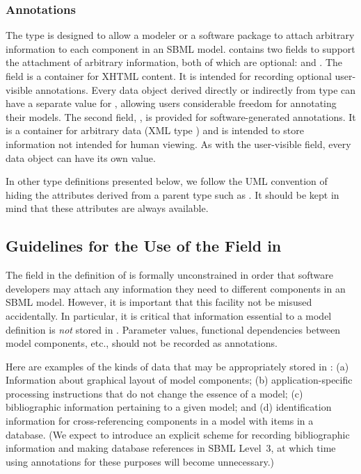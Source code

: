 \documentclass[10pt]{cekarticle}
\begin{document}
\subsubsection{Annotations}

The type  is designed to allow a modeler or a
software package to attach arbitrary information to each component
in an SBML model.   contains two fields to support
the attachment of arbitrary information, both of which are
optional:  and . The field
 is a container for XHTML content.  It is intended
for recording optional user-visible annotations.  Every data
object derived directly or indirectly from type  can
have a separate value for , allowing users
considerable freedom for annotating their models.  The second
field, , is provided for software-generated
annotations.  It is a container for arbitrary data (XML type
) and is intended to store information not intended for
human viewing.  As with the user-visible  field,
every data object can have its own  value.

In other type definitions presented below, we follow the UML
convention of hiding the attributes derived from a parent type
such as . It should be kept in mind that these
attributes are always available.

\subsection{Guidelines for the Use of the  Field in
  }

The  field in the definition of  is
formally unconstrained in order that software developers may attach any
information they need to different components in an SBML model. However,
it is important that this facility not be misused accidentally.  In
particular, it is critical that information essential to a model definition
is \emph{not} stored in .  Parameter values, functional
dependencies between model components, etc., should not be recorded as
annotations.

Here are examples of the kinds of data that may be appropriately
stored in : (a) Information about graphical
layout of model components; (b) application-specific processing
instructions that do not change the essence of a model; (c)
bibliographic information pertaining to a given model; and (d)
identification information for cross-referencing components in a
model with items in a database.  (We expect to introduce an
explicit scheme for recording bibliographic information and making
database references in SBML Level~3, at which time using
annotations for these purposes will become unnecessary.)
\end{document}
